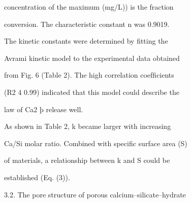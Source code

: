 \documentclass[a4paper,portrait,12pt]{article}
\begin{document}
\begin{flushleft}
concentration of the maximum (mg/L)) is the fraction
\end{flushleft}


\begin{flushleft}
conversion. The characteristic constant n was 0.9019.
\end{flushleft}


\begin{flushleft}
The kinetic constants were determined by ﬁtting the
\end{flushleft}


\begin{flushleft}
Avrami kinetic model to the experimental data obtained
\end{flushleft}


\begin{flushleft}
from Fig. 6 (Table 2). The high correlation coefﬁcients
\end{flushleft}


\begin{flushleft}
(R2 4 0.99) indicated that this model could describe the
\end{flushleft}


\begin{flushleft}
law of Ca2 þ release well.
\end{flushleft}


\begin{flushleft}
As shown in Table 2, k became larger with increasing
\end{flushleft}


\begin{flushleft}
Ca/Si molar ratio. Combined with speciﬁc surface area (S)
\end{flushleft}


\begin{flushleft}
of materials, a relationship between k and S could be
\end{flushleft}


\begin{flushleft}
established (Eq. (3)).
\end{flushleft}





\begin{flushleft}
3.2. The pore structure of porous calcium--silicate--hydrate
\end{flushleft}
\end{document}
